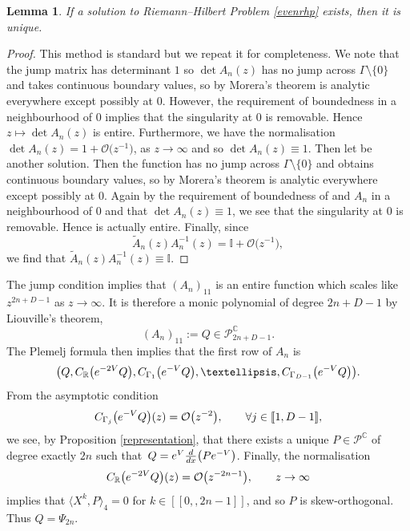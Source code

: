 \documentclass[11pt]{article}
\numberwithin{equation}{section}
\numberwithin{equation}{section}
\newtheorem{Lemma}[Theorem]{Lemma}
\begin{document}
\begin{Lemma}\label{uniqueness} If a solution to Riemann--Hilbert Problem {\rm \ref{evenrhp}} exists, then it is unique.
\end{Lemma}
\begin{proof}
This method is standard but we repeat it for completeness. We note that the jump matrix has determinant $1$ so $\det A_{n}(z) $ has no jump across $\Gamma \setminus \{ 0 \}$ and takes continuous boundary values, so by Morera's theorem is analytic everywhere except possibly at $0$. However, the requirement of boundedness in a neighbourhood of $0$ implies that the singularity at $0$ is removable. Hence $z \mapsto \det A_{n}(z)$ is entire. Furthermore, we have the normalisation
$\det A_{n}(z) = 1 + \mathcal{O}\big(z^{-1}\big)$,
 as $z \to \infty$ and so $\det A_{n}(z) \equiv 1$.
Then let  be another solution. Then the function 
has no jump across $\Gamma \setminus \{0 \}$ and obtains continuous boundary values, so by Morera's theorem is analytic everywhere except possibly at $0$. Again by the requirement of boundedness of  and $A_n$ in a neighbourhood of $0$ and that $\det A_n(z) \equiv 1$, we see that the singularity at $0$ is removable. Hence  is actually entire. Finally, since
\begin{equation*}
\tilde{A}_{n}(z) A_{n}^{-1}(z) = \mathbb{I}+\mathcal{O}\big(z^{-1}\big),
\end{equation*}
we find that $\tilde{A}_{n}(z) A_{n}^{-1}(z) \equiv \mathbb{I}$.
\end{proof}

The jump condition implies that $(A_{n})_{11}$ is an entire function which scales like $z^{2n+D-1}$ as $z \to \infty$. It is therefore a monic polynomial of degree $2n+D-1$ by Liouville's theorem,
\begin{equation*}
(A_{n})_{11} := Q \in \mathscr{P}_{2n+D-1}^\mathbb{C}.
\end{equation*}
The Plemelj formula then implies that the first row of $A_{n}$ is
\begin{equation*}
\big( Q , C_{\mathbb{R}}\big({\rm e}^{-2V} Q\big) , C_{\Gamma_1}\big({\rm e}^{-V} Q\big) , \dots , C_{\Gamma_{D-1}}\big({\rm e}^{-V} Q\big)\big).
\end{equation*}
 From the asymptotic condition
 \begin{align*}
 C_{\Gamma_j}\big({\rm e}^{-V} Q\big)(z) = \mathcal{O}\big(z^{-2}\big),\qquad \forall j \in [\![ 1,D-1]\!],
 \end{align*}
we see, by Proposition \ref{representation}, that there exists a unique $P \in \mathscr{P}^\mathbb{C}$ of degree exactly $2n$ such that~${Q = {\rm e}^{V} \frac{\rm d}{{\rm d}x}\big(P {\rm e}^{-V}\big)}$. Finally, the normalisation
\begin{align*}
C_{\mathbb{R}}\big({\rm e}^{-2V} Q\big)(z) = \mathcal{O}\big(z^{-2n-1}\big) ,\qquad z \to \infty
\end{align*}
implies that $\langle \mathit{X}^k , P\rangle_4 =0 $ for $k \in [\![0, , 2n-1]\!]$, and so $P$ is skew-orthogonal. Thus $Q = \Psi_{2n}$.
\end{document}
